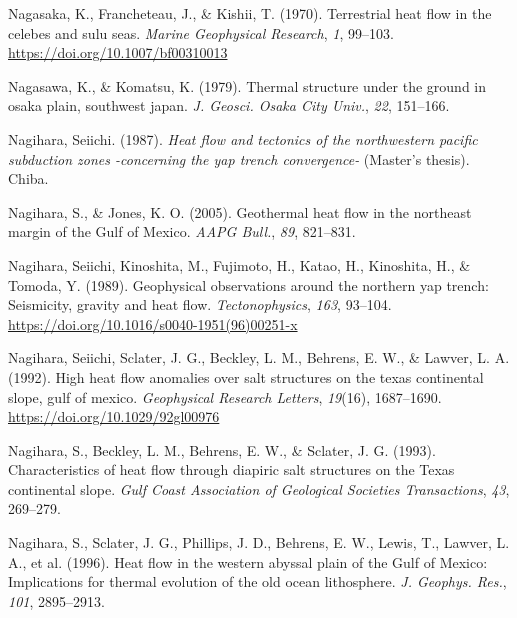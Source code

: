 \documentclass[draft,linenumbers]{agujournal2018}
\begin{document}
\leavevmode{}%
Nagasaka, K., Francheteau, J., \& Kishii, T. (1970). Terrestrial heat
flow in the celebes and sulu seas. \emph{Marine Geophysical Research},
\emph{1}, 99--103. \url{https://doi.org/10.1007/bf00310013}

\leavevmode{}%
Nagasawa, K., \& Komatsu, K. (1979). Thermal structure under the ground
in osaka plain, southwest japan. \emph{J. Geosci. Osaka City Univ.},
\emph{22}, 151--166.

\leavevmode{}%
Nagihara, Seiichi. (1987). \emph{Heat flow and tectonics of the
northwestern pacific subduction zones -concerning the yap trench
convergence-} (Master's thesis). Chiba.

\leavevmode{}%
Nagihara, S., \& Jones, K. O. (2005). Geothermal heat flow in the
northeast margin of the {Gulf of Mexico}. \emph{AAPG Bull.}, \emph{89},
821--831.

\leavevmode{}%
Nagihara, Seiichi, Kinoshita, M., Fujimoto, H., Katao, H., Kinoshita,
H., \& Tomoda, Y. (1989). Geophysical observations around the northern
yap trench: Seismicity, gravity and heat flow. \emph{Tectonophysics},
\emph{163}, 93--104. \url{https://doi.org/10.1016/s0040-1951(96)00251-x}

\leavevmode{}%
Nagihara, Seiichi, Sclater, J. G., Beckley, L. M., Behrens, E. W., \&
Lawver, L. A. (1992). High heat flow anomalies over salt structures on
the texas continental slope, gulf of mexico. \emph{Geophysical Research
Letters}, \emph{19}(16), 1687--1690.
\url{https://doi.org/10.1029/92gl00976}

\leavevmode{}%
Nagihara, S., Beckley, L. M., Behrens, E. W., \& Sclater, J. G. (1993).
Characteristics of heat flow through diapiric salt structures on the
{Texas} continental slope. \emph{Gulf Coast Association of Geological
Societies Transactions}, \emph{43}, 269--279.

\leavevmode{}%
Nagihara, S., Sclater, J. G., Phillips, J. D., Behrens, E. W., Lewis,
T., Lawver, L. A., et al. (1996). Heat flow in the western abyssal plain
of the {Gulf of Mexico}: Implications for thermal evolution of the old
ocean lithosphere. \emph{J. Geophys. Res.}, \emph{101}, 2895--2913.
\end{document}
